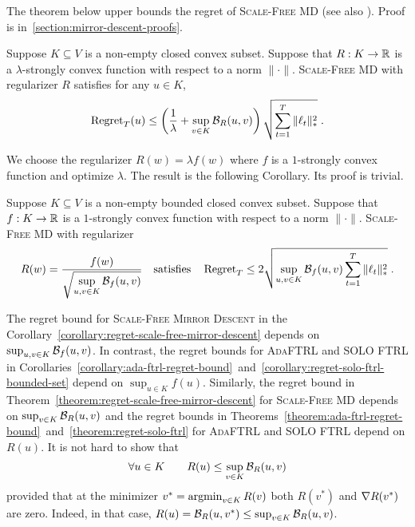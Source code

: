 The theorem below upper bounds the regret of \textsc{Scale-Free MD} (see also
\cite{Duchi-Hazan-Singer-2011,Duchi-Shalev-Shwartz-Singer-Tewari-2010,Rakhlin-Sridharan-2013}).
Proof is in~\ref{section:mirror-descent-proofs}.

\begin{theorem}
\label{theorem:regret-scale-free-mirror-descent}
Suppose $K \subseteq V$ is a non-empty closed convex subset. Suppose that $R:K
\to \mathbb{R}$ is a $\lambda$-strongly convex function with respect to a norm
$\|\cdot\|$.  \textsc{Scale-Free MD} with regularizer $R$ satisfies
for any $u \in K$,
$$
\operatorname{Regret}_T(u)
\le
\left( \frac{1}{\lambda} + \sup_{v \in K} \mathcal{B}_R(u,v) \right) \sqrt{\sum_{t=1}^T \|\ell_t\|_*^2} \; .
$$
\end{theorem}

We choose the regularizer $R(w) = \lambda f(w)$ where $f$ is a $1$-strongly convex
function and optimize $\lambda$. The result is the following Corollary. Its
proof is trivial.

\begin{corollary}
\label{corollary:regret-scale-free-mirror-descent}
Suppose $K \subseteq V$ is a non-empty bounded closed convex subset.  Suppose
that $f:K \to \mathbb{R}$ is a $1$-strongly convex function with respect to a norm
$\|\cdot\|$.  \textsc{Scale-Free MD} with regularizer
$$
R(w) = \frac{f(w)}{\displaystyle \sqrt{\sup_{u,v \in K} \Breg_f(u,v)}}
\quad \text{satisfies} \quad %
\Regret_T \le 2 \sqrt{\sup_{u,v \in K} \Breg_f(u,v) \sum_{t=1}^T \|\ell_t\|_*^2} \; .
$$
\end{corollary}

The regret bound for \textsc{Scale-Free Mirror Descent} in the
Corollary~\ref{corollary:regret-scale-free-mirror-descent} depends on
$\sup_{u,v \in K} \mathcal{B}_f(u,v)$. In contrast, the regret bounds for
\textsc{AdaFTRL} and \textsc{SOLO FTRL} in
Corollaries~\ref{corollary:ada-ftrl-regret-bound}~and~\ref{corollary:regret-solo-ftrl-bounded-set}
depend on $\sup_{u \in K} f(u)$.  Similarly, the regret bound in
Theorem~\ref{theorem:regret-scale-free-mirror-descent} for \textsc{Scale-Free
MD} depends on $\sup_{v \in K} \mathcal{B}_R(u,v)$ and the regret bounds in
Theorems~\ref{theorem:ada-ftrl-regret-bound}~and~\ref{theorem:regret-solo-ftrl}
for \textsc{AdaFTRL} and \textsc{SOLO FTRL} depend on $R(u)$. It is not hard to
show that
\begin{equation}
\label{equation:regularizer-vs-divergence}
\forall u \in K \qquad R(u) \le \sup_{v \in K} \mathcal{B}_R(u,v)
\end{equation}
provided that at the minimizer $v^* = \operatorname*{argmin}_{v \in K} R(v)$ both $R(v^*)$ and
$\nabla R(v^*)$ are zero. Indeed, in that case, $R(u) = \mathcal{B}_R(u,v^*) \le
\sup_{v \in K} \mathcal{B}_R(u,v)$.

